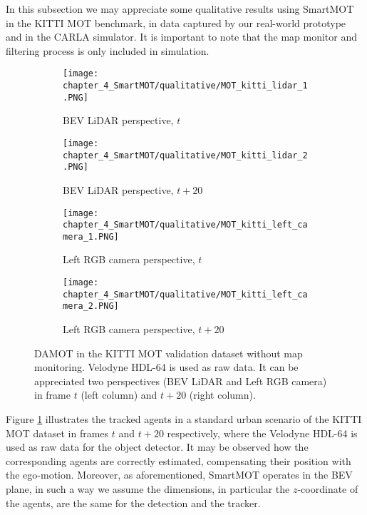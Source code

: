 In this subsection we may appreciate some qualitative results using SmartMOT in the KITTI \ac{MOT} benchmark, in data captured by our real-world prototype and in the \ac{CARLA} simulator. It is important to note that the map monitor and filtering process is only included in simulation. 

\begin{figure}[!h]
	\centering
	\begin{subfigure}{0.45\textwidth}
		\captionsetup{justification=centering}
		\texttt{[image: chapter\_4\_SmartMOT/qualitative/MOT\_kitti\_lidar\_1.PNG]}
		\caption{\ac{BEV} \ac{LiDAR} perspective, $t$}
	\end{subfigure}
	\hfill
	\begin{subfigure}{0.45\textwidth}
		\captionsetup{justification=centering}
		\texttt{[image: chapter\_4\_SmartMOT/qualitative/MOT\_kitti\_lidar\_2.PNG]}
		\caption{\ac{BEV} \ac{LiDAR} perspective, $t+20$}
	\end{subfigure}
	\hfill
	\begin{subfigure}{0.45\textwidth}
		\captionsetup{justification=centering}
		\texttt{[image: chapter\_4\_SmartMOT/qualitative/MOT\_kitti\_left\_camera\_1.PNG]}
		\caption{Left RGB camera perspective, $t$}
	\end{subfigure}
	\hfill
	\begin{subfigure}{0.45\textwidth}
		\captionsetup{justification=centering}
		\texttt{[image: chapter\_4\_SmartMOT/qualitative/MOT\_kitti\_left\_camera\_2.PNG]}
		\caption{Left RGB camera perspective, $t+20$}
	\end{subfigure}
	\captionsetup{justification=justified}
	\caption[\ac{DAMOT} in the KITTI \ac{MOT} validation dataset without map monitoring]{\ac{DAMOT} in the KITTI \ac{MOT} validation dataset without map monitoring. Velodyne HDL-64 is used as raw data. It can be appreciated two perspectives (\ac{BEV} \ac{LiDAR} and Left RGB camera) in frame $t$ (left column) and $t+20$ (right column).}
	\label{fig:chapter_4_SmartMOT/MOT_KITTI}
\end{figure}

Figure \ref{fig:chapter_4_SmartMOT/MOT_KITTI} illustrates the tracked agents in a standard urban scenario of the KITTI \ac{MOT} dataset in frames $t$ and $t+20$ respectively, where the Velodyne HDL-64 is used as raw data for the object detector. It may be observed how the corresponding agents are correctly estimated, compensating their position with the ego-motion. Moreover, as aforementioned, SmartMOT operates in the \ac{BEV} plane, in such a way we assume the dimensions, in particular the $z$-coordinate of the agents, are the same for the detection and the tracker.

